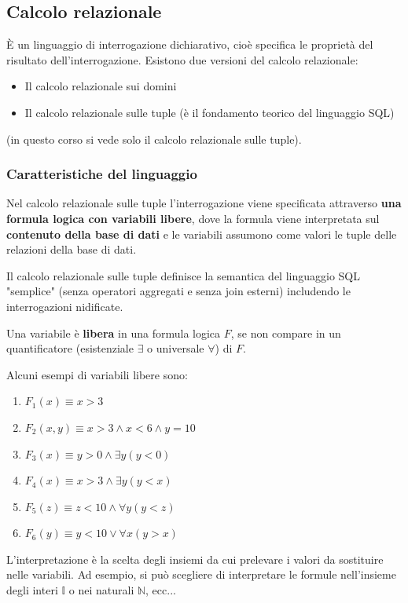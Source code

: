 \documentclass[a4paper,twoside]{article}
\begin{document}
\subsection{Calcolo relazionale}
È un linguaggio di interrogazione dichiarativo, cioè specifica le proprietà del risultato
dell'interrogazione.
Esistono due versioni del calcolo relazionale:
\begin{itemize}
  \item Il calcolo relazionale sui domini
  \item Il calcolo relazionale sulle tuple (è il fondamento teorico del linguaggio SQL)
\end{itemize}
(in questo corso si vede solo il calcolo relazionale sulle tuple).

\subsubsection{Caratteristiche del linguaggio}
Nel calcolo relazionale sulle tuple l'interrogazione viene specificata attraverso
\textbf{una formula logica con variabili libere}, dove la formula viene interpretata sul
\textbf{contenuto della base di dati} e le variabili assumono come valori le tuple
delle relazioni della base di dati.

\vspace{1em}
\noindent
Il calcolo relazionale sulle tuple definisce la semantica del linguaggio SQL "semplice"
(senza operatori aggregati e senza join esterni) includendo le interrogazioni nidificate.

\begin{definition}
  Una variabile è \textbf{libera} in una formula logica \( F \), se non compare in un
  quantificatore (esistenziale \( \exists  \) o universale \( \forall  \)) di \( F \).
\end{definition}

\begin{example}
  Alcuni esempi di variabili libere sono:
  \begin{enumerate}
    \item \( F_1(x) \equiv x > 3  \) 
    \item \( F_2(x,y) \equiv x > 3 \wedge x < 6 \wedge y = 10  \) 
    \item \( F_3(x) \equiv y > 0 \wedge \exists y (y < 0) \)
    \item \( F_4(x) \equiv x > 3 \wedge \exists y (y < x)  \)
    \item \( F_5(z) \equiv z < 10 \wedge \forall y (y < z)  \)
    \item \( F_6(y) \equiv y < 10 \vee \forall x (y > x)  \)
  \end{enumerate}
\end{example}
L'interpretazione è la scelta degli insiemi da cui prelevare i valori da sostituire nelle
variabili. Ad esempio, si può scegliere di interpretare le formule nell'insieme degli
interi \( \mathbb{I} \) o nei naturali \( \mathbb{N} \), ecc...
\end{document}

